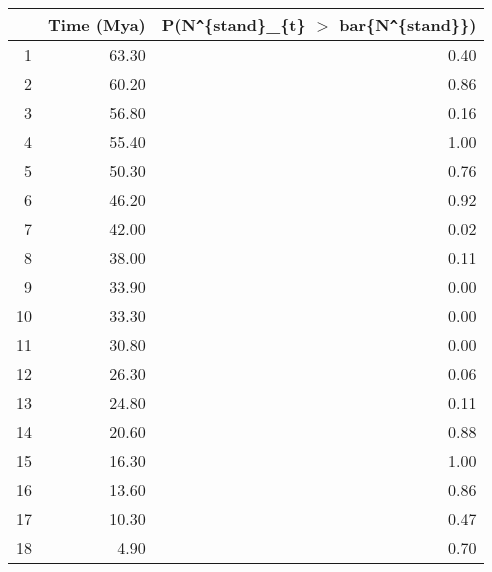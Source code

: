 \begin{table}[ht]
\centering
\begin{tabular}{rrr}
  \hline
 & Time (Mya) & P(N\verb|^|\{stand\}\_\{t\} $>$ bar\{N\verb|^|\{stand\}\}) \\ 
  \hline
1 & 63.30 & 0.40 \\ 
  2 & 60.20 & 0.86 \\ 
  3 & 56.80 & 0.16 \\ 
  4 & 55.40 & 1.00 \\ 
  5 & 50.30 & 0.76 \\ 
  6 & 46.20 & 0.92 \\ 
  7 & 42.00 & 0.02 \\ 
  8 & 38.00 & 0.11 \\ 
  9 & 33.90 & 0.00 \\ 
  10 & 33.30 & 0.00 \\ 
  11 & 30.80 & 0.00 \\ 
  12 & 26.30 & 0.06 \\ 
  13 & 24.80 & 0.11 \\ 
  14 & 20.60 & 0.88 \\ 
  15 & 16.30 & 1.00 \\ 
  16 & 13.60 & 0.86 \\ 
  17 & 10.30 & 0.47 \\ 
  18 & 4.90 & 0.70 \\ 
   \hline
\end{tabular}
\label{tab:div_peak}
\end{table}
